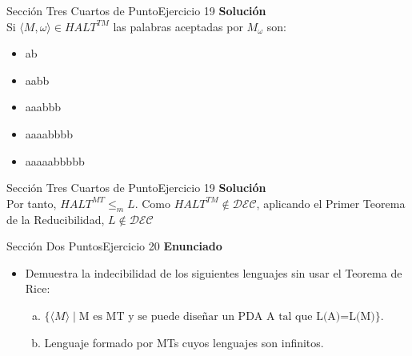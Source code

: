 \documentclass[10pt, envcountsect, presentation, aspectratio=169]{beamer}
\begin{document}

\begin{frame}{Sección Tres Cuartos de Punto}{Ejercicio 19}
    \textbf{Solución}\\
    Si $\langle M, \omega \rangle \in HALT^{TM}$ las palabras aceptadas por $M_{\omega}$ son:
    \begin{itemize}
    \item ab
    \item aabb
    \item aaabbb
    \item aaaabbbb
    \item aaaaabbbbb
    \end{itemize} 
\end{frame}


\begin{frame}{Sección Tres Cuartos de Punto}{Ejercicio 19}
    \textbf{Solución}\\
    Por tanto, $HALT^{MT} \le_m L$. Como $HALT^{TM} \notin \mathcal{DEC}$, aplicando el Primer Teorema de la Reducibilidad, $L \notin \mathcal{DEC}$
\end{frame}


\begin{frame}{Sección Dos Puntos}{Ejercicio 20}
    \textbf{Enunciado}
    \begin{itemize}
        \item Demuestra la indecibilidad de los siguientes lenguajes sin usar el Teorema de Rice:
        \begin{enumerate}[a)]
            \item $\{\langle M \rangle \mid \mbox{M es MT y  se puede diseñar  un PDA A tal que L(A)=L(M)}\}$.
            \item Lenguaje formado por MTs  cuyos lenguajes son infinitos.
        \end{enumerate}
    \end{itemize}
\end{frame}

\end{document}
